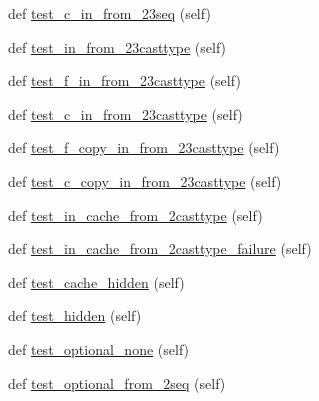 \begin{DoxyCompactItemize}
\item 
def \hyperlink{classnumpy_1_1f2py_1_1tests_1_1test__array__from__pyobj_1_1TestSharedMemory_aa161a33766d73aa6cd66e26790b16ae1}{test\+\_\+c\+\_\+in\+\_\+from\+\_\+23seq} (self)
\item 
def \hyperlink{classnumpy_1_1f2py_1_1tests_1_1test__array__from__pyobj_1_1TestSharedMemory_afbadc15c8e65b887048044c057a9470c}{test\+\_\+in\+\_\+from\+\_\+23casttype} (self)
\item 
def \hyperlink{classnumpy_1_1f2py_1_1tests_1_1test__array__from__pyobj_1_1TestSharedMemory_a7076eee175a8ec613ae5e0fbc3750a5a}{test\+\_\+f\+\_\+in\+\_\+from\+\_\+23casttype} (self)
\item 
def \hyperlink{classnumpy_1_1f2py_1_1tests_1_1test__array__from__pyobj_1_1TestSharedMemory_a7715a86c02d0619530c2122c17b610f9}{test\+\_\+c\+\_\+in\+\_\+from\+\_\+23casttype} (self)
\item 
def \hyperlink{classnumpy_1_1f2py_1_1tests_1_1test__array__from__pyobj_1_1TestSharedMemory_a289eaa0897595cb84f3323ac409f935a}{test\+\_\+f\+\_\+copy\+\_\+in\+\_\+from\+\_\+23casttype} (self)
\item 
def \hyperlink{classnumpy_1_1f2py_1_1tests_1_1test__array__from__pyobj_1_1TestSharedMemory_a6f45d7261a1454916391d4878a41ff40}{test\+\_\+c\+\_\+copy\+\_\+in\+\_\+from\+\_\+23casttype} (self)
\item 
def \hyperlink{classnumpy_1_1f2py_1_1tests_1_1test__array__from__pyobj_1_1TestSharedMemory_a0c81134ca57a85e73a51c6dea7462d4a}{test\+\_\+in\+\_\+cache\+\_\+from\+\_\+2casttype} (self)
\item 
def \hyperlink{classnumpy_1_1f2py_1_1tests_1_1test__array__from__pyobj_1_1TestSharedMemory_af43f4f86e5ed833d72f3161da99808cf}{test\+\_\+in\+\_\+cache\+\_\+from\+\_\+2casttype\+\_\+failure} (self)
\item 
def \hyperlink{classnumpy_1_1f2py_1_1tests_1_1test__array__from__pyobj_1_1TestSharedMemory_a733c17fc9e53aaa9eeaf521e6653cabd}{test\+\_\+cache\+\_\+hidden} (self)
\item 
def \hyperlink{classnumpy_1_1f2py_1_1tests_1_1test__array__from__pyobj_1_1TestSharedMemory_a660267e552bba9060987bd33defd288f}{test\+\_\+hidden} (self)
\item 
def \hyperlink{classnumpy_1_1f2py_1_1tests_1_1test__array__from__pyobj_1_1TestSharedMemory_a86c7c4a869bfc4aab861a05aa795dbda}{test\+\_\+optional\+\_\+none} (self)
\item 
def \hyperlink{classnumpy_1_1f2py_1_1tests_1_1test__array__from__pyobj_1_1TestSharedMemory_aaa2c0a0b5719c2c068be64a2922f63c2}{test\+\_\+optional\+\_\+from\+\_\+2seq} (self)

\end{DoxyCompactItemize}
